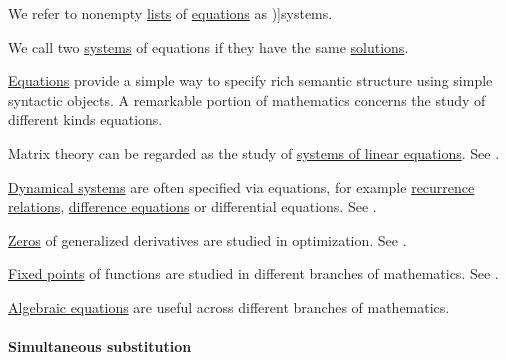 \begin{definition}\label{def:system_of_equations}\mimprovised
  We refer to nonempty \hyperref[def:ordered_tuple]{lists} of \hyperref[def:equation]{equations} as \term[en=equation system (\cite[\S 5.4.1]{Mimram2020ProgramEqualsProof})]{systems}.
\end{definition}

\begin{concept}\label{con:equivalent_systems_of_equations}
  We call two \hyperref[def:system_of_equations]{systems} of equations  if they have the same \hyperref[prob:equation_solution]{solutions}.
\end{concept}

\begin{example}\label{ex:def:equation}
  \hyperref[def:equation]{Equations} provide a simple way to specify rich semantic structure using simple syntactic objects. A remarkable portion of mathematics concerns the study of different kinds equations.

  \begin{thmenum}
     Matrix theory can be regarded as the study of \hyperref[def:system_of_linear_equations]{systems of linear equations}. See .

     \hyperref[def:dynamical_system]{Dynamical systems} are often specified via equations, for example \hyperref[def:recurrence_relation]{recurrence relations}, \hyperref[def:difference_equation]{difference equations} or differential equations. See .

     \hyperref[def:zero_of_function]{Zeros} of generalized derivatives are studied in optimization. See .

     \hyperref[def:function_fixed_point]{Fixed points} of functions are studied in different branches of mathematics. See .

     \hyperref[def:polynomial_equation]{Algebraic equations} are useful across different branches of mathematics.
  \end{thmenum}
\end{example}

\paragraph{Simultaneous substitution}

